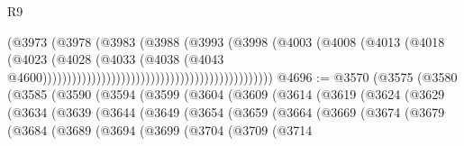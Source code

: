 \begin{lexlean}{R9}
\begin{coremodule}
{{{{{{{{{{{{{{{{{{{{{{{{{{{{{{{{{{{{{{{{{{{{{{{{{{{{{{{{{{{{{{{{{{{{{{{{{{{{{{{{{{{{                                                                    (@3973
                                                                      (@3978
                                                                        (@3983
                                                                          (@3988
                                                                            (@3993
                                                                              (@3998
                                                                                (@4003
                                                                                  (@4008
                                                                                    (@4013
                                                                                      (@4018
                                                                                        (@4023
                                                                                          (@4028
                                                                                            (@4033
                                                                                              (@4038
                                                                                                (@4043
                                                                                                  @4600)))))))))))))))))))))))))))))))))))))))))))))))
@4696 := @3570
    (@3575
      (@3580
        (@3585
          (@3590
            (@3594
              (@3599
                (@3604
                  (@3609
                    (@3614
                      (@3619
                        (@3624
                          (@3629
                            (@3634
                              (@3639
                                (@3644
                                  (@3649
                                    (@3654
                                      (@3659
                                        (@3664
                                          (@3669
                                            (@3674
                                              (@3679
                                                (@3684
                                                  (@3689
                                                    (@3694
                                                      (@3699
                                                        (@3704
                                                          (@3709
                                                            (@3714
}}}}}}}}}}}}}}}}}}}}}}}}}}}}}}}}}}}}}}}}}}}}}}}}}}}}}}}}}}}}}}}}}}}}}}}}}}}}}}}}}}}}
\end{coremodule}
\end{lexlean}
